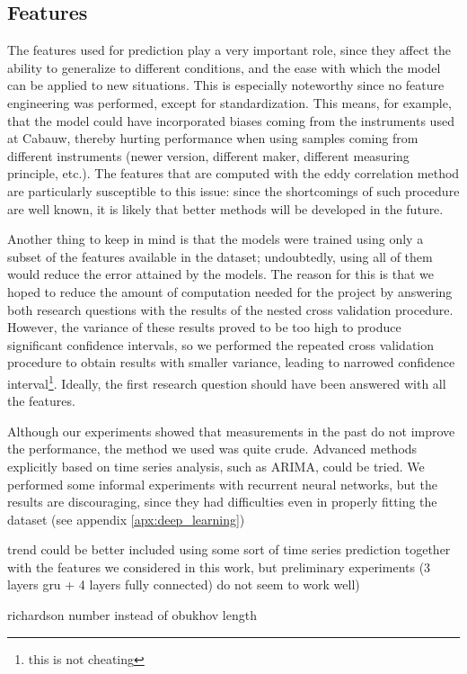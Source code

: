 \documentclass[a4paper]{book}
\begin{document}
\subsection{Features}
The features used for prediction play a very important role, since they affect the ability to generalize to different conditions, and the ease with which the model can be applied to new situations. This is especially noteworthy since no feature engineering was performed, except for standardization. This means, for example, that the model could have incorporated biases coming from the instruments used at Cabauw, thereby hurting performance when using samples coming from different instruments (newer version, different maker, different measuring principle, etc.). The features that are computed with the eddy correlation method are particularly susceptible to this issue: since the shortcomings of such procedure are well known, it is likely that better methods will be developed in the future.

Another thing to keep in mind is that the models were trained using only a subset of the features available in the dataset; undoubtedly, using all of them would reduce the error attained by the models. The reason for this is that we hoped to reduce the amount of computation needed for the project by answering both research questions with the results of the nested cross validation procedure. However, the variance of these results proved to be too high to produce significant confidence intervals, so we performed the repeated cross validation procedure to obtain results with smaller variance, leading to narrowed confidence interval\footnote{this is not cheating}. Ideally, the first research question should have been answered with all the features.

Although our experiments showed that measurements in the past do not improve the performance, the method we used was quite crude. Advanced methods explicitly based on time series analysis, such as ARIMA, could be tried. We performed some informal experiments with recurrent neural networks, but the results are discouraging, since they had difficulties even in properly fitting the dataset (see appendix \ref{apx:deep_learning})

trend could be better included using some sort of time series prediction together with the features we considered in this work, but preliminary experiments (3 layers gru + 4 layers fully connected) do not seem to work well)


richardson number instead of obukhov length
\end{document}

